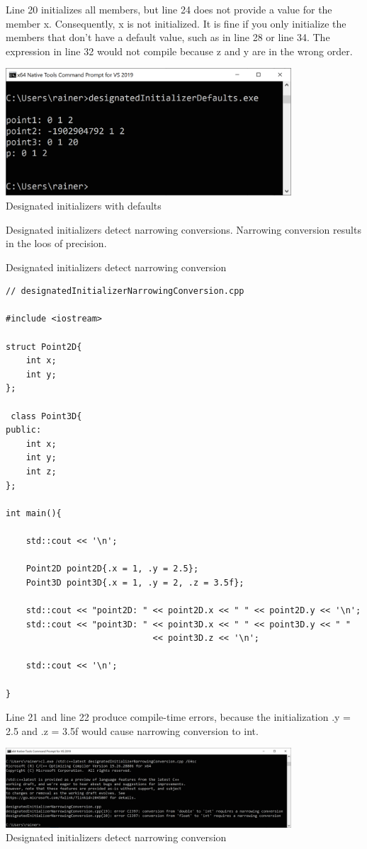Line 20 initializes all members, but line 24 does not provide a value for the member x. Consequently, x is not initialized. It is fine if you only initialize the members that don’t have a default value, such as in line 28 or line 34. The expression in line 32 would not compile because z and y are in the wrong order.

\begin{center}
\includegraphics[width=0.8\textwidth]{content/3/chapter4/images/34.png}\\
Designated initializers with defaults
\end{center}

Designated initializers detect narrowing conversions. Narrowing conversion results in the loos of precision.

\noindent
Designated initializers detect narrowing conversion
\begin{lstlisting}[style=styleCXX]
// designatedInitializerNarrowingConversion.cpp

#include <iostream>

struct Point2D{
	int x;
	int y;
};

 class Point3D{
public:
	int x;
	int y;
	int z;
};

int main(){
	
	std::cout << '\n';
	
	Point2D point2D{.x = 1, .y = 2.5};
	Point3D point3D{.x = 1, .y = 2, .z = 3.5f};
	
	std::cout << "point2D: " << point2D.x << " " << point2D.y << '\n';
	std::cout << "point3D: " << point3D.x << " " << point3D.y << " "
							 << point3D.z << '\n';
	
	std::cout << '\n';

}
\end{lstlisting}

Line 21 and line 22 produce compile-time errors, because the initialization .y = 2.5 and .z = 3.5f would cause narrowing conversion to int.

\begin{center}
\includegraphics[width=0.8\textwidth]{content/3/chapter4/images/35.png}\\
Designated initializers detect narrowing conversion
\end{center}

